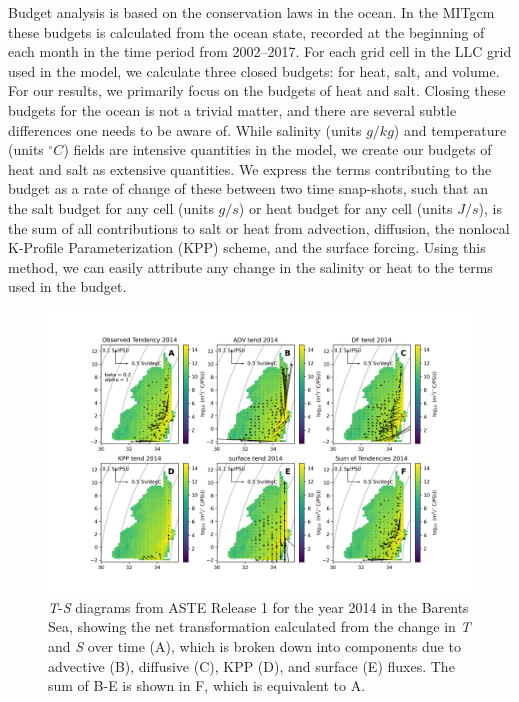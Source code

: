 \documentclass[a4paper,12pt]{article}
\begin{document}
    Budget analysis is based on the conservation laws in the ocean. In the MITgcm these budgets is calculated from the ocean state, recorded at the beginning of each month in the time period from 2002--2017. For each grid cell in the LLC grid used in the model, we calculate three closed budgets: for heat, salt, and volume. For our results, we primarily focus on the budgets of heat and salt. Closing these budgets for the ocean is not a trivial matter, and there are several subtle differences one needs to be aware of. While salinity (units $g/kg$) and temperature (units $^\circ C$) fields are intensive quantities in the model, we create our budgets of heat and salt as extensive quantities. We express the terms contributing to the budget as a rate of change of these between two time snap-shots, such that an the salt budget for any cell (units $g/s$) or heat budget for any cell (units $J/s$), is the sum of all contributions to salt or heat from advection, diffusion, the nonlocal K-Profile Parameterization (KPP) scheme, and the surface forcing. Using this method, we can easily attribute any change in the salinity or heat to the terms used in the budget.

    \begin{figure} %
    \centering
    \includegraphics[width=\linewidth]{../figures/BarentsS_alltend_2014.png}
    \caption{\emph{T}-\emph{S} diagrams from ASTE Release 1 for the year 2014 in the Barents Sea, showing the net transformation calculated from the change in \emph{T} and \emph{S} over time (A), which is broken down into components due to advective (B), diffusive (C), KPP (D), and surface (E) fluxes. The sum of B-E is shown in F, which is equivalent to A.}
    \label{fig:sample_wmt}
    \end{figure}
\end{document}
